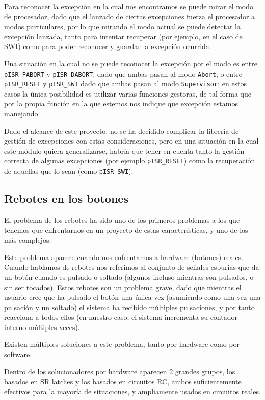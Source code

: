 \documentclass[12pt,letterpaper]{article}
\begin{document}
Para reconocer la excepción en la cual nos encontramos se puede mirar
el modo de procesador, dado que el lanzado de ciertas excepciones
fuerza el procesador a modos particulares, por lo que mirando el modo
actual se puede detectar la excepción lanzada, tanto para intentar
recuperar (por ejemplo, en el caso de SWI) como para poder reconocer y
guardar la excepción ocurrida.

Una situación en la cual no se puede reconocer la excepción por el
modo es entre \texttt{pISR\_PABORT} y \texttt{pISR\_DABORT}, dado que
ambas pasan al modo \texttt{Abort}; o entre \texttt{pISR\_RESET} y
\texttt{pISR\_SWI} dado que ambas pasan al modo \texttt{Supervisor};
en estos casos la única posibilidad es utilizar varias funciones
gestoras, de tal forma que por la propia función en la que estemos nos
indique que excepción estamos manejando.

Dado el alcance de este proyecto, no se ha decidido complicar la
librería de gestión de excepciones con estas consideraciones, pero en
una situación en la cual este módulo quiera generalizarse, habría que
tener en cuenta tanto la gestión correcta de algunas excepciones (por
ejemplo \texttt{pISR\_RESET}) como la recuperación de aquellas que lo
sean (como \texttt{pISR\_SWI}).

\subsection{Rebotes en los botones}
\label{subsec:rebotes}
El problema de los rebotes ha sido uno de los primeros problemas a los
que tenemos que enfrentarnos en un proyecto de estas características,
y uno de los más complejos.

Este problema aparece cuando nos enfrentamos a hardware (botones)
reales. Cuando hablamos de rebotes nos referimos al conjunto de
señales espurias que da un botón cuando es pulsado o soltado (algunos
incluso mientras son pulsados, o sin ser tocados). Estos rebotes son
un problema grave, dado que mientras el usuario cree que ha pulsado el
botón una única vez (asumiendo como una vez una pulsación y un
soltado) el sistema ha recibido múltiples pulsaciones, y por tanto
reacciona a todos ellos (en nuestro caso, el sistema incrementa su
contador interno múltiples veces).

Existen múltiples soluciones a este problema, tanto por hardware como
por software.

Dentro de los solucionadores por hardware aparecen 2 grandes grupos,
los basados en SR latches y los basados en circuitos RC, ambos
suficientemente efectivos para la mayoría de situaciones, y
ampliamente usados en circuitos reales.
\end{document}
